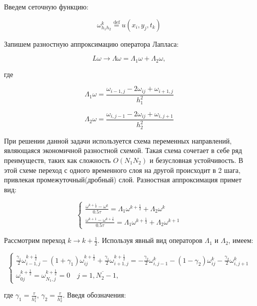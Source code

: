 \documentclass[12pt]{article}
\begin{document}
			Введем сеточную функцию:
			
			$$\omega^k_{h_1 h_2} \overset{\mathrm{def}}{=} u(x_i, y_j, t_k)$$
			
			Запишем разностную аппроксимацию оператора Лапласа:
			
			$$L\omega \rightarrow \Lambda\omega = \Lambda_1\omega + \Lambda_2 \omega,$$
			
			где
			
			$$\Lambda_1\omega = \frac{\omega_{i-1,j} - 2\omega_{ij} + \omega_{i+1,j}}{h^2_1}$$
			
			$$\Lambda_2\omega = \frac{\omega_{i,j-1} - 2\omega_{ij} + \omega_{i,j+1}}{h^2_2}$$
			
			При решении данной задачи используется схема переменных направлений, являющаяся экономичной разностной схемой. Такая схема сочетает в себе ряд преимуществ, таких как сложность $O\left(N_1 N_2\right)$ и безусловная устойчивость.
			В этой схеме переход с одного временного слоя на другой происходит в 2 шага, привлекая промежуточный(дробный) слой. Разностная аппроксимация примет вид:
			
			\begin{equation}
				\begin{cases}
					\frac{\omega^{k+\frac{1}{2}} - \omega^k}{0.5\tau} = \Lambda_1 \omega^{k + \frac{1}{2}} + \Lambda_2 \omega^k\\
								
					\frac{ \omega^{k+1} - \omega^{k+\frac{1}{2}}}{0.5\tau} = \Lambda_1 \omega^{k + \frac{1}{2}} + \Lambda_2 \omega^{k+1}
				\end{cases}
			\end{equation}
			
			Рассмотрим переход $k \rightarrow k + \frac{1}{2}$. Используя явный вид операторов $\Lambda_1$ и $\Lambda_2$, имеем:
			
			\begin{equation}
				\begin{cases}
					\frac{\gamma_1}{2} \omega^{k+ \frac{1}{2}}_{i-1,j} - (1+ \gamma_1) \omega^{k+\frac{1}{2}}_{ij} + \frac{\gamma_1}{2} \omega^{k+\frac{1}{2}}_{i+1,j} = -\frac{\gamma_2}{2} \omega^k_{i,j-1} - (1 - \gamma_2) \omega^k_{ij} - \frac{\gamma_2}{2} \omega^k_{i,j+1} \\
					\omega^{k+\frac{1}{2}}_{0j} = \omega^{k+\frac{1}{2}}_{N_1,j} = 0 \quad j = \overline{1, N_2-1},
				\end{cases}
			\end{equation}
			
			где $\gamma_1 = \frac{\tau}{h_1^2}$, $\gamma_2 = \frac{\tau}{h_2^2}$.
			Введя обозначения:
			
\end{document}
